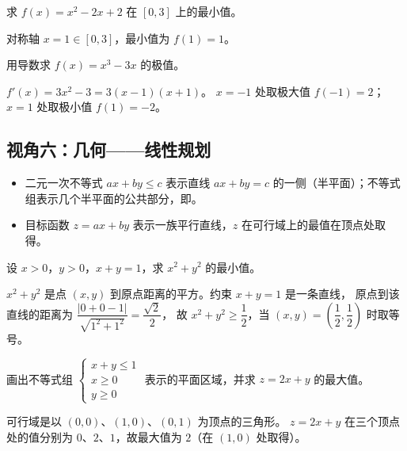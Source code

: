 \begin{explore}
\begin{problem}
求 $f(x)=x^2-2x+2$ 在 $[0,3]$ 上的最小值。
\end{problem}
\begin{solution}
对称轴 $x=1\in[0,3]$，最小值为 $f(1)=1$。
\end{solution}

\begin{problem}
用导数求 $f(x)=x^3-3x$ 的极值。
\end{problem}
\begin{solution}
$f'(x)=3x^2-3=3(x-1)(x+1)$。
$x=-1$ 处取极大值 $f(-1)=2$；$x=1$ 处取极小值 $f(1)=-2$。
\end{solution}

\subsection{视角六：几何——线性规划}

\begin{itemize}
  \item 二元一次不等式 $ax+by\leq c$ 表示直线 $ax+by=c$ 的一侧（半平面）；不等式组表示几个半平面的公共部分，即。
  \item 目标函数 $z=ax+by$ 表示一族平行直线，$z$ 在可行域上的最值在顶点处取得。
\end{itemize}

\begin{example}
设 $x>0$，$y>0$，$x+y=1$，求 $x^2+y^2$ 的最小值。
\end{example}
\begin{solution}
$x^2+y^2$ 是点 $(x,y)$ 到原点距离的平方。约束 $x+y=1$ 是一条直线，
原点到该直线的距离为 $\dfrac{|0+0-1|}{\sqrt{1^2+1^2}}=\dfrac{\sqrt2}{2}$，
故 $x^2+y^2\geq\dfrac12$，当 $(x,y)=\left(\dfrac12,\dfrac12\right)$ 时取等号。
\end{solution}

\begin{example}
画出不等式组 $\begin{cases}x+y\leq1\\ x\geq0\\ y\geq0\end{cases}$ 表示的平面区域，并求 $z=2x+y$ 的最大值。
\end{example}
\begin{solution}
可行域是以 $(0,0)$、$(1,0)$、$(0,1)$ 为顶点的三角形。
$z=2x+y$ 在三个顶点处的值分别为 $0$、$2$、$1$，故最大值为 $2$（在 $(1,0)$ 处取得）。
\end{solution}


\end{explore}

